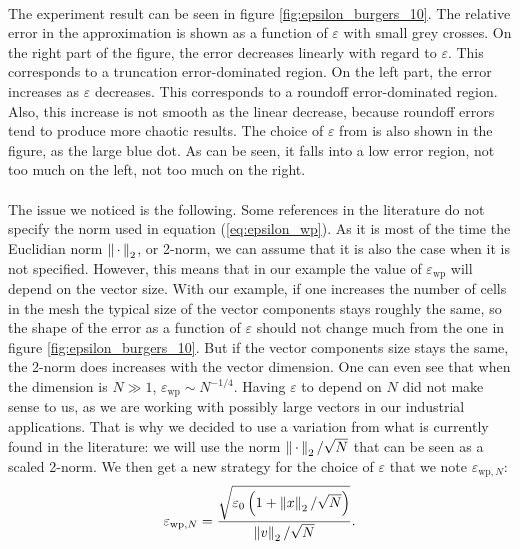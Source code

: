       \paragraph{}
      The experiment result can be seen in figure \ref{fig:epsilon_burgers_10}.
      The relative error in the approximation is shown as a function of $\varepsilon$ with small grey crosses.
      On the right part of the figure, the error decreases linearly with regard to $\varepsilon$.
      This corresponds to a truncation error-dominated region.
      On the left part, the error increases as $\varepsilon$ decreases.
      This corresponds to a roundoff error-dominated region.
      Also, this increase is not smooth as the linear decrease, because roundoff errors tend to produce more chaotic results.
      The choice of $\varepsilon$ from \cite{PerniceWalker1998} is also shown in the figure, as the large blue dot.
      As can be seen, it falls into a low error region, not too much on the left, not too much on the right.

      \paragraph{}
      The issue we noticed is the following.
      Some references in the literature do not specify the norm used in equation (\ref{eq:epsilon_wp}).
      As it is most of the time the Euclidian norm $\norm[2]{\,\cdot\,}$, or 2-norm, we can assume that it is also the case when it is not specified.
      However, this means that in our example the value of $\varepsilon_\textrm{wp}$ will depend on the vector size.
      With our example, if one increases the number of cells in the mesh the typical size of the vector components stays roughly the same, so the shape of the error as a function of $\varepsilon$ should not change much from the one in figure \ref{fig:epsilon_burgers_10}.
      But if the vector components size stays the same, the 2-norm does increases with the vector dimension.
      One can even see that when the dimension is $N \gg 1$, $\varepsilon_\textrm{wp} \sim N^{-1/4}$.
      Having $\varepsilon$ to depend on $N$ did not make sense to us, as we are working with possibly large vectors in our industrial applications.
      That is why we decided to use a variation from what is currently found in the literature: we will use the norm $\norm[2]{\,\cdot\,} / \sqrt{N}$ that can be seen as a scaled 2-norm.
      We then get a new strategy for the choice of $\varepsilon$ that we note $\varepsilon_{\textrm{wp}, N}$:
      \begin{equation}
        \varepsilon_{\textrm{wp}, N} = \frac{\sqrt{\varepsilon_0 \left(1 + \norm[2]{x} / \sqrt{N}\right) }}{\norm[2]{v} / \sqrt{N}} .
      \end{equation}

